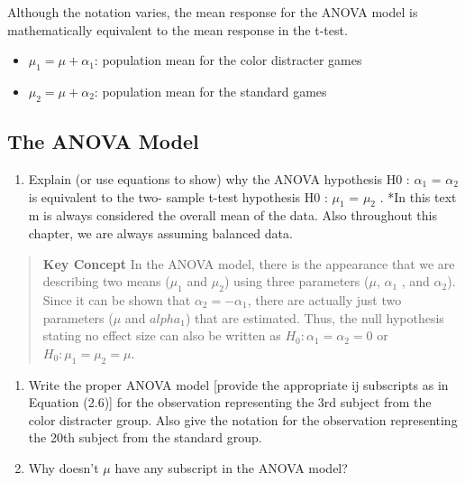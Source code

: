 \documentclass[
]{report}
\providecommand{\tightlist}{%
  \setlength{\itemsep}{0pt}\setlength{\parskip}{0pt}}
\begin{document}
Although the notation varies, the mean response for the ANOVA model is mathematically equivalent to the mean response in the t-test.

\begin{itemize}
\tightlist
\item
  \(\mu_1 = \mu + \alpha_1\): population mean for the color distracter games
\item
  \(\mu_2 = \mu + \alpha_2\): population mean for the standard games
\end{itemize}

\subsection*{The ANOVA Model}\label{the-anova-model-1}

\begin{enumerate}
\def\labelenumi{\arabic{enumi}.}
\setcounter{enumi}{15}
\tightlist
\item
  Explain (or use equations to show) why the ANOVA hypothesis H0 : \(\alpha_1\) = \(\alpha_2\) is equivalent to the two- sample t-test hypothesis H0 : \(\mu_1\) = \(\mu_2\) .
  *In this text m is always considered the overall mean of the data. Also throughout this chapter, we are always assuming balanced data.
\end{enumerate}

\begin{quote}
\textbf{Key Concept}
In the ANOVA model, there is the appearance that we are describing two means (\(\mu_1\) and \(\mu_2\)) using three parameters (\(\mu\), \(\alpha_1\) , and \(\alpha_2\)). Since it can be shown that \(\alpha_2 = -\alpha_1\), there are actually just two parameters (\(\mu\) and \(alpha_1\)) that are estimated. Thus, the null hypothesis stating no effect size can also be written as \(H_0: \alpha_1 = \alpha_2 = 0\) or \(H_0: \mu_1 = \mu_2 = \mu\).
\end{quote}

\begin{enumerate}
\def\labelenumi{\arabic{enumi}.}
\setcounter{enumi}{16}
\item
  Write the proper ANOVA model {[}provide the appropriate ij subscripts as in Equation (2.6){]} for the observation representing the 3rd subject from the color distracter group. Also give the notation for the observation representing the 20th subject from the standard group.
\item
  Why doesn't \(\mu\) have any subscript in the ANOVA model?
\end{enumerate}
\end{document}
